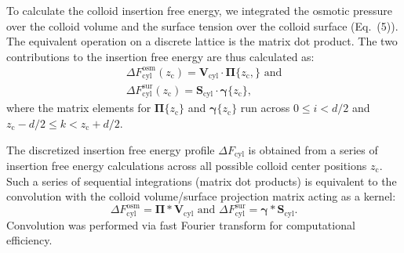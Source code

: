 \documentclass[10pt, a4paper]{article}
\begin{document}
\begin{multicols}{2}
To calculate the colloid insertion free energy, we integrated the osmotic pressure over the colloid volume and the surface tension over the colloid surface (Eq.~(5)).
The equivalent operation on a discrete lattice is the matrix dot product.
The two contributions to the insertion free energy are thus calculated as:
\begin{equation}\label{eq:cyl_fe_osm}
    \begin{split}
        \Delta F_{\text{cyl}}^{\text{osm}}(z_{\text{c}}) = \mathbf{V}_{\text{cyl}} \cdot \boldsymbol{\Pi}\{z_{\text{c}},\} \text{ and}
        \\
        \Delta F_{\text{cyl}}^{\text{sur}}(z_{\text{c}}) = \mathbf{S}_{\text{cyl}} \cdot \boldsymbol{\gamma}\{z_{\text{c}}\},
    \end{split}
\end{equation}
where the matrix elements for $\boldsymbol{\Pi}\{z_{\text{c}}\}$ and $\boldsymbol{\gamma}\{z_{\text{c}}\}$ run across $0 \leq i < d/2$ and $z_{\text{c}} - d/2 \leq k < z_{\text{c}} + d/2$.

The discretized insertion free energy profile $\Delta F_{\text{cyl}}$ is obtained from a series of insertion free energy calculations across all possible colloid center positions $z_{\text{c}}$.
Such a series of sequential integrations (matrix dot products) is equivalent to the convolution with the colloid volume/surface projection matrix acting as a kernel:
\begin{equation}
    \Delta F_{\text{cyl}}^{\text{osm}} = \boldsymbol{\Pi} \ast \mathbf{V}_{\text{cyl}} \text{ and }
    \Delta F_{\text{cyl}}^{\text{sur}} = \boldsymbol{\gamma} \ast \mathbf{S}_{\text{cyl}}.
\end{equation}
Convolution was performed via fast Fourier transform for computational efficiency.

\end{multicols}


\end{document}
